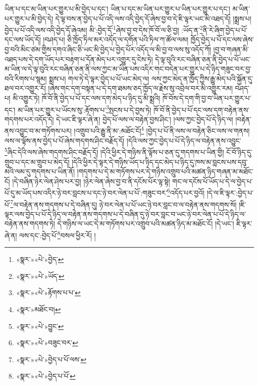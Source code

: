ཡིན་པ་དང་མ་ཡིན་པར་གྱུར་པ་མི་བྱེད་པ་དང་། ཡིན་པ་དང་མ་ཡིན་པར་གྱུར་པ་ཡིན་པར་གྱུར་པ་དང་། མ་ཡིན་པར་གྱུར་པ་མི་བྱེད་དེ། དེ་ལྟ་བས་ན་བྱེད་པ་པོ་འདི་ལས་འདི་བྱེད་དོ་ཞེས་བྱ་བ་དེ་ཇི་ལྟར་ཡང་མི་འཐད་དོ། །སྨྲས་པ། བྱེད་པ་པོ་འདི་ལས་འདི་བྱེད་དོ་ཞེའམ། མི་:བྱེད་དོ་\footnote{«སྣར་»«པེ་»བྱེད་}ཞེས་བྱ་བ་དེས་ཁོ་བོ་ལ་ཅི་བྱ། :ཡོད་ན་\footnote{«སྣར་»«པེ་»ཡོད་}ནི་རེ་ཞིག་བྱེད་པ་པོ་དང་ལས་ཡོད་དོ། །བཤད་པ། ཅི་ཁྱོད་ཏིལ་མར་འདོད་ལ་དགོན་པའི་ཏིལ་ཀ་ཚོལ་ལམ། ཁྱོད་བྱེད་པ་པོ་དང་ལས་ཞེས་བྱ་བའི་མིང་ཙམ་གྱིས་དགའ་ཞིང་ཅི་ཡང་མི་བྱེད་པ་བྱེད་པོར་འདོད་ལ་མི་བྱ་བ་ལས་སུ་འདོད་ཀོ། །བྱ་བ་གཞན་མི་འཐད་པས་དེ་དག་ཡོད་པར་བརྟག་པ་དོན་མེད་པར་འགྱུར་དུ་ངེས་ཏེ། དེ་ལྟ་བུའི་རང་བཞིན་ཅན་ནི་བྱེད་པ་པོ་ཡང་མ་ཡིན་ལ་དེ་ལྟ་བུའི་རང་བཞིན་ཅན་ནི་ལས་ཀྱང་མ་ཡིན་པས་འདིར་གང་བདེན་པར་གྱུར་པ་དེ་ཉིད་གཟུང་བར་བྱ་བའི་རིགས་པ་སྙམ། སྨྲས་པ། གལ་ཏེ་དེ་ལྟར་བྱེད་པ་པོ་ཡང་མེད་ལ། ལས་ཀྱང་མེད་ན་ཁྱོད་ཀྱིས་རྒྱུ་མེད་པའི་སྐྱོན་དུ་ཐལ་བར་འགྱུར་རོ། །ཞེས་གང་དག་བསྟན་པ་དེ་དག་ཐམས་ཅད་ཁྱོད་ལ་རྗེས་སུ་འབྲེལ་བར་མི་འགྱུར་རམ། བཤད་པ། མི་འགྱུར་ཏེ། ཁོ་བོ་ནི་བྱེད་པ་པོ་དང་ལས་དག་མེད་པ་ཉིད་དུ་མི་སྨྲའི། ཁོ་བོས་དེ་དག་གི་བྱ་བ་ཡིན་པར་གྱུར་པ་དང་། མ་ཡིན་པར་གྱུར་པ་ཡོངས་སུ་:རྟོགས་པ་\footnote{«སྣར་»«པེ་»རྟོགས་པ་པ་}སྤངས་པ་དེ་བྱས་ཏེ། ཁོ་བོ་ནི་བྱེད་པ་པོ་དང་ལས་དག་བརྟེན་ནས་གདགས་པར་འདོད་དེ། དེ་ཡང་ཇི་ལྟར་ཞེ་ན། བྱེད་པོ་ལས་ལ་བརྟེན་བྱས་ཤིང་། །ལས་ཀྱང་བྱེད་པོ་དེ་ཉིད་ལ། །བརྟེན་ནས་འབྱུང་བ་མ་གཏོགས་པར། །འགྲུབ་པའི་རྒྱུ་ནི་མ་:མཐོང་ངོ།\footnote{«སྣར་»མཐོང་བ།} །བྱེད་པ་པོ་ནི་ལས་ལ་བརྟེན་ཅིང་ལས་ལ་གནས། ལས་ལ་ལྟོས་ནས་བྱེད་པ་པོ་ཞེས་གདགས་ཤིང་བརྗོད་དོ། །དེའི་ལས་ཀྱང་བྱེད་པ་པོ་དེ་ཉིད་ལ་བརྟེན་ནས་འབྱུང་\footnote{«སྣར་»«པེ་»བྱུང་}ཞིང་དེའི་ལས་ཞེས་གདགས་ཤིང་བརྗོད་དོ། །དེའི་ཕྱིར་དེ་གཉིས་ནི་ལྟོས་པ་ཅན་དུ་གདགས་པ་ཡིན་གྱི། ངོ་བོ་ཉིད་དུ་གྲུབ་པ་དང་མ་གྲུབ་པ་མེད་དོ། །དེའི་ཕྱིར་དེ་ལྟར་དེ་གཉིས་ཡོད་པ་ཉིད་དང་མེད་པ་ཉིད་དུ་ཁས་མ་བླངས་པས་དབུ་མའི་ལམ་དུ་གདགས་པ་ཡིན་ནོ། །གདགས་པ་དེ་མ་གཏོགས་པར་དེ་གཉིས་འགྲུབ་པའི་མཚན་ཉིད་གཞན་མ་མཐོང་ངོ། །དེ་བཞིན་ཉེར་ལེན་ཤེས་པར་བྱ། །ཉེར་ལེན་ཞེས་བྱ་བ་ནི་དངོས་པོར་ལྟ་སྟེ། གང་ལ་དངོས་པོ་ཡོད་པ་དེ་ལ་བྱེད་པ་པོ་དུ་མ་ཡོད་པས་འདིར་ཉེ་བར་བླངས་པ་དང་ཉེ་བར་ལེན་པ་པོ་:གཟུང་བར་\footnote{«སྣར་»«པེ་»བཟུང་བར་}འདོད་པར་བྱའོ། །དེ་ལ་ཇི་ལྟར་:བྱེད་པ་པོ་\footnote{«སྣར་»«པེ་»བྱེད་པ་པོ་ལས་}ལ་བརྟེན་ནས་གདགས་པ་དེ་བཞིན་དུ། ཉེ་བར་ལེན་པ་པོ་ཡང་ཉེ་བར་བླང་བ་ལ་བརྟེན་ནས་གདགས་སོ། །ཇི་ལྟར་ལས་བྱེད་པ་པོ་དེ་ཉིད་ལ་བརྟེན་ནས་གདགས་པ་དེ་བཞིན་དུ་ཉེ་བར་བླང་བ་ཡང་ཉེ་བར་ལེན་པ་པོ་དེ་ཉིད་ལ་བརྟེན་ནས་གདགས་ཏེ། དེ་གཉིས་ལ་ཡང་དེ་མ་གཏོགས་པར་འགྲུབ་པའི་མཚན་ཉིད་མ་མཐོང་ངོ། །དེ་ཡང་། ཇི་ལྟར་ཞེ་ན། ལས་དང་:བྱེད་པོ་\footnote{«སྣར་»«པེ་»བྱེད་པ་པོ་}བསལ་ཕྱིར་རོ། །
